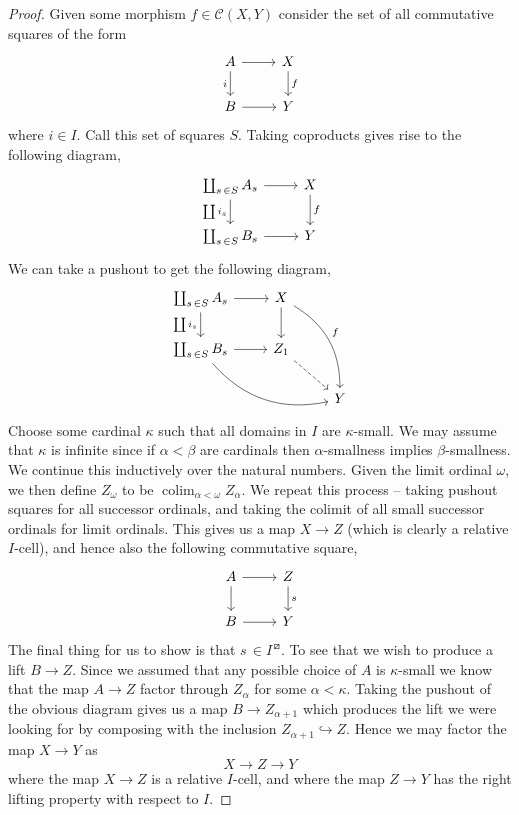 \documentclass{amsart}
\DeclareMathOperator{\colim}{colim}
\theoremstyle{definition}
\begin{document}
  \begin{proof}
    Given some morphism $f\in \mathcal{C}(X,Y)$
    consider the set of all commutative squares of the form
    \[
      \begin{tikzcd}
        A\arrow[r]\arrow[d,"i"'] & X \arrow[d,"f"] \\
        B \arrow[r] & Y
      \end{tikzcd}
    \]
    where $i\in I$.  Call this set of squares $S$. Taking coproducts
    gives rise to the following diagram,
    \[
      \begin{tikzcd}
        \coprod_{s\,\in S} A_s \arrow[d, "\coprod i_s"'] \arrow[r] & X
        \arrow[d,"f"]\\
        \coprod_{s\,\in S} B_s \arrow[r] & Y
      \end{tikzcd}
    \]
    We can take a pushout to get the following diagram,
    \[
      \begin{tikzcd}
        \coprod_{s\,\in S} A_s \arrow[d, "\coprod i_s"'] \arrow[r] & X
        \arrow[d] \arrow[ddr,bend left, "f"] &\\
        \coprod_{s\,\in S} B_s \arrow[r]\arrow[drr, bend right] & Z_1
        \arrow[dr, dashed] & \\
        & & Y
      \end{tikzcd}
    \]
    Choose some cardinal $\kappa$ such that all domains in $I$ are
    $\kappa$-small. We may assume that $\kappa$ is infinite since
    if $\alpha<\beta$ are cardinals then $\alpha$-smallness
    implies $\beta$-smallness.
    We continue this inductively over the natural numbers. Given the limit
    ordinal $\omega$, we then define $Z_\omega$ to be
    $\colim_{\alpha<\omega} Z_\alpha$. We repeat this process --
    taking pushout squares for all successor ordinals, and
    taking the colimit of all small successor ordinals
    for limit ordinals. This gives us a map
    $X\to Z$ (which is clearly a relative $I$-cell),
    and hence also the following commutative square,
    \[
      \begin{tikzcd}
        A\arrow[r]\arrow[d] & Z \arrow[d, "s"]\\
        B\arrow[r] & Y
      \end{tikzcd}
    \]
    The final thing for us to show is that $s\,\in I^{\,\boxslash}$.
    To see that we wish to produce a lift $B\to Z$.
    Since we assumed that any possible choice of $A$ is
    $\kappa$-small we know that the map $A\to Z$
    factor through $Z_\alpha$ for some $\alpha<\kappa$.
    Taking the pushout of the obvious diagram gives us a map
    $B\to Z_{\alpha+1}$ which produces the lift we were looking for
    by composing with the inclusion $Z_{\alpha+1}\hookrightarrow Z$. 
    Hence we may
    factor the map $X\to Y$ as $$X\to Z\to Y$$
    where the map $X\to Z$ is a relative $I$-cell, and where the map
    $Z\to Y$ has the right lifting property with respect to
    $I$.
  \end{proof}
\end{document}
